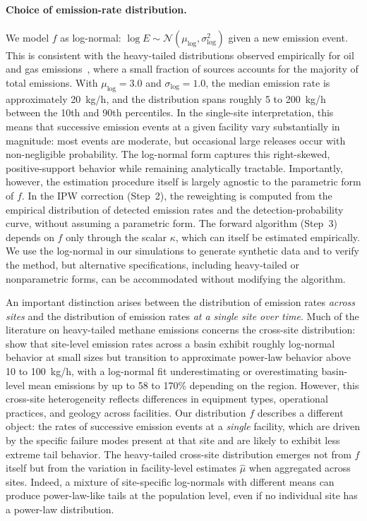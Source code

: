 \documentclass[11pt]{article}
\begin{document}
\paragraph{Choice of emission-rate distribution.}
We model $f$ as log-normal: $\log E \sim \mathcal{N}(\mu_{\log}, \sigma_{\log}^2)$ given a new emission event. This is consistent with the heavy-tailed distributions observed empirically for oil and gas emissions~\citep{Brandt2016, ZavalaAraiza2015}, where a small fraction of sources accounts for the majority of total emissions. With $\mu_{\log} = 3.0$ and $\sigma_{\log} = 1.0$, the median emission rate is approximately 20~kg/h, and the distribution spans roughly 5 to 200~kg/h between the 10th and 90th percentiles. In the single-site interpretation, this means that successive emission events at a given facility vary substantially in magnitude: most events are moderate, but occasional large releases occur with non-negligible probability. The log-normal form captures this right-skewed, positive-support behavior while remaining analytically tractable. Importantly, however, the estimation procedure itself is largely agnostic to the parametric form of $f$. In the IPW correction (Step~2), the reweighting is computed from the empirical distribution of detected emission rates and the detection-probability curve, without assuming a parametric form. The forward algorithm (Step~3) depends on $f$ only through the scalar $\kappa$, which can itself be estimated empirically. We use the log-normal in our simulations to generate synthetic data and to verify the method, but alternative specifications, including heavy-tailed or nonparametric forms, can be accommodated without modifying the algorithm.

An important distinction arises between the distribution of emission rates \emph{across sites} and the distribution of emission rates \emph{at a single site over time}. Much of the literature on heavy-tailed methane emissions concerns the cross-site distribution: \citet{Sherwin2024Nature} show that site-level emission rates across a basin exhibit roughly log-normal behavior at small sizes but transition to approximate power-law behavior above 10 to 100~kg/h, with a log-normal fit underestimating or overestimating basin-level mean emissions by up to 58 to 170\% depending on the region. However, this cross-site heterogeneity reflects differences in equipment types, operational practices, and geology across facilities. Our distribution $f$ describes a different object: the rates of successive emission events at a \emph{single} facility, which are driven by the specific failure modes present at that site and are likely to exhibit less extreme tail behavior. The heavy-tailed cross-site distribution emerges not from $f$ itself but from the variation in facility-level estimates $\hat{\mu}$ when aggregated across sites. Indeed, a mixture of site-specific log-normals with different means can produce power-law-like tails at the population level, even if no individual site has a power-law distribution.
\end{document}
